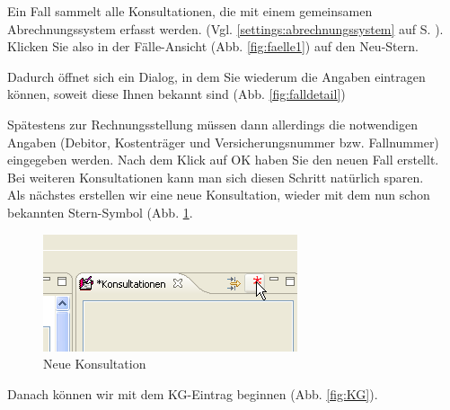 Ein Fall sammelt alle Konsultationen, die mit einem gemeinsamen Abrechnungssystem erfasst werden. (Vgl. \ref{settings:abrechnungssystem} auf S. \pageref{settings:abrechnungssystem}).
Klicken Sie also in der \glqq Fälle\grqq{}-Ansicht
(Abb. \ref{fig:faelle1}) auf den \glqq Neu\grqq{}-Stern.

Dadurch öffnet sich ein Dialog, in dem Sie wiederum die Angaben eintragen
können, soweit diese Ihnen bekannt sind (Abb. \ref{fig:falldetail})

Spätestens zur Rechnungsstellung müssen dann allerdings die notwendigen Angaben (Debitor, Kostenträger und Versicherungsnummer bzw. Fallnummer)
eingegeben werden.
Nach dem Klick auf OK haben Sie den neuen Fall erstellt. Bei weiteren
Konsultationen kann man sich diesen Schritt natürlich sparen.\\
\bigskip
Als nächstes erstellen wir eine neue Konsultation, wieder mit dem nun schon
bekannten Stern-Symbol (Abb. \ref{fig:neuekons}.
\begin{figure}[ht]
	\includegraphics{images/einf5}
	\caption{Neue Konsultation}
	\label{fig:neuekons}
\end{figure}
\pagebreak[2]
Danach können wir mit dem KG-Eintrag beginnen (Abb. \ref{fig:KG}).
